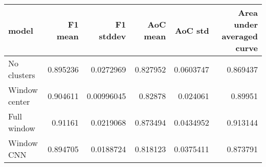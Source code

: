 \begin{tabular}{lrrrrr}
\toprule
 model         &   F1 mean &   F1 stddev &   AoC mean &   AoC std &   Area under averaged curve \\
\midrule
 No clusters   &  0.895236 &  0.0272969  &   0.827952 & 0.0603747 &                    0.869437 \\
 Window center &  0.904611 &  0.00996045 &   0.82878  & 0.024061  &                    0.89951  \\
 Full window   &  0.91161  &  0.0219068  &   0.873494 & 0.0434952 &                    0.913144 \\
 Window CNN    &  0.894705 &  0.0188724  &   0.818123 & 0.0375411 &                    0.873791 \\
\bottomrule
\end{tabular}